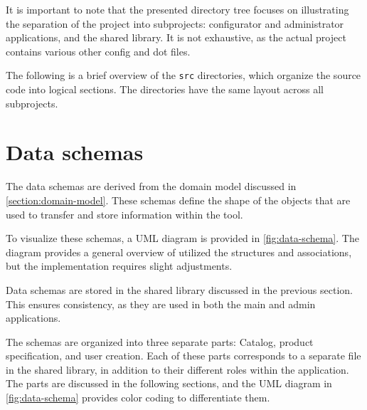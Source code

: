 It is important to note that the presented directory tree focuses on illustrating the separation of the project into subprojects: configurator and administrator applications, and the shared library. It is not exhaustive, as the actual project contains various other config and dot files.

The following is a brief overview of the \texttt{src} directories, which organize the source code into logical sections. The directories have the same layout across all subprojects.

\vspace{12pt}
\vspace{16pt}


\section{Data schemas}

The data schemas are derived from the domain model discussed in \autoref{section:domain-model}. These schemas define the shape of the objects that are used to transfer and store information within the tool. 

To visualize these schemas, a UML diagram is provided in \autoref{fig:data-schema}. The diagram provides a general overview of utilized the structures and associations, but the implementation requires slight adjustments.

Data schemas are stored in the shared library discussed in the previous section. This ensures consistency, as they are used in both the main and admin applications. 

The schemas are organized into three separate parts: Catalog, product specification, and user creation. Each of these parts corresponds to a separate file in the shared library, in addition to their different roles within the application. The parts are discussed in the following sections, and the UML diagram in \autoref{fig:data-schema} provides color coding to differentiate them.

